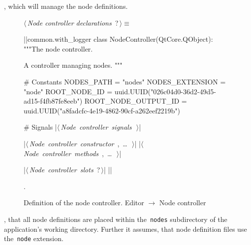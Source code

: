 \documentclass[%
    a4paper,    %
    justified,  %
    nobib,      %
    openany     %
]{tufte-book}
\makeatletter
\renewcommand{\label}[1]{\@tufte@label{##1}}%
\makeatother
\begin{document}
, which will manage the
node definitions.

\begin{figure}
\begin{flushleft} \small
\begin{minipage}{\linewidth}\label{scrap106}\raggedright\small
{} $\langle\,${\itshape Node controller declarations}\nobreak\ {\footnotesize {?}}$\,\rangle\equiv$
\vspace{-1ex}
\begin{pythoncode}
|\normalfont{}\fontfamily{}|common.with_logger
class NodeController(QtCore.QObject):
    """The node controller.

    A controller managing nodes.
    """

    # Constants
    NODES_PATH = "nodes"
    NODES_EXTENSION = "node"
    ROOT_NODE_ID = uuid.UUID("026c04d0-36d2-49d5-ad15-f4fb87fe8eeb")
    ROOT_NODE_OUTPUT_ID = uuid.UUID("a8fadcfc-4e19-4862-90cf-a262eef2219b")

    # Signals
    |\hbox{$\langle\,${\itshape Node controller signals}\nobreak\ {\footnotesize {}}$\,\rangle$}|

    |\hbox{$\langle\,${\itshape Node controller constructor}\nobreak\ {\footnotesize {}, \ldots\ }$\,\rangle$}|
    |\hbox{$\langle\,${\itshape Node controller methods}\nobreak\ {\footnotesize {}, \ldots\ }$\,\rangle$}|

    |\hbox{$\langle\,${\itshape Node controller slots}\nobreak\ {\footnotesize ?}$\,\rangle$}|
|\NWsep|
\end{pythoncode}
\vspace{1.5ex}
\footnotesize
\begin{list}{}{\setlength{\itemsep}{-\parsep}\setlength{\itemindent}{-\leftmargin}}
\item {\NWtxtMacroNoRef}.

\item{}
\end{list}
\end{minipage}\vspace{4ex}
\end{flushleft}
\caption{Definition of the node controller.
  \newline{}\newline{}Editor $\rightarrow$ Node controller}
\label{editor:lst:node-controller}
\end{figure}

, that all node definitions are placed
within the~\verb=nodes= subdirectory of the application's working directory.
Further it assumes, that node definition files use the~\verb=node= extension.
\end{document}
